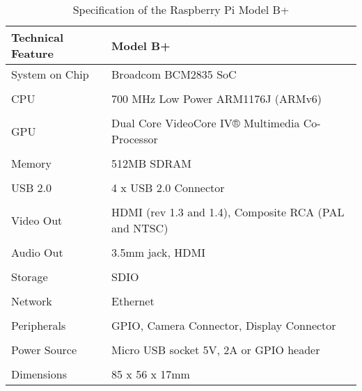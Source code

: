 \begin{table}[h]\centering
\begin{adjustbox}{width={\textwidth},totalheight={\textheight},keepaspectratio}%
\renewcommand{\arraystretch}{0.5}%
\begin{tabular}{ll}
\toprule Technical Feature & Model B+ \\

\midrule System on Chip & Broadcom BCM2835 SoC                                 \\
\\ CPU                  & 700 MHz Low Power ARM1176J (ARMv6)                   \\
\\ GPU                  & Dual Core VideoCore IV® Multimedia Co-Processor      \\
\\ Memory               & 512MB SDRAM                                          \\
\\ USB 2.0              & 4 x USB 2.0 Connector                                \\
\\ Video Out            & HDMI (rev 1.3 and 1.4), Composite RCA (PAL and NTSC) \\
\\ Audio Out            & 3.5mm jack, HDMI                                     \\
\\ Storage              & SDIO                                                 \\
\\ Network              & Ethernet                                             \\
\\ Peripherals          & GPIO, Camera Connector, Display Connector            \\
\\ Power Source         & Micro USB socket 5V, 2A or GPIO header               \\
\\ Dimensions           & 85 x 56 x 17mm                                       \\

\bottomrule
\end{tabular}%
\end{adjustbox}

\caption{Specification of the Raspberry Pi Model B+}
\end{table}

